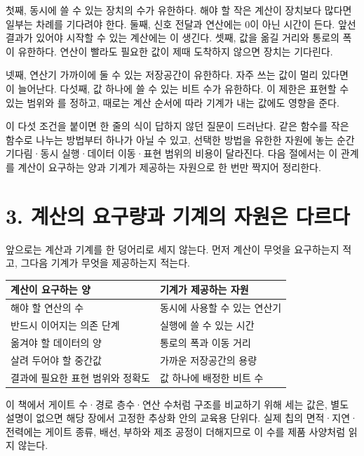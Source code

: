 첫째, 동시에 쓸 수 있는  장치의 수가 유한하다. 해야 할 작은 계산이 장치보다 많다면 일부는 차례를 기다려야 한다. 둘째, 신호 전달과 연산에는 0이 아닌 시간이 든다. 앞선 결과가 있어야 시작할 수 있는 계산에는 이 생긴다. 셋째, 값을 옮길 거리와 통로의 폭이 유한하다. 연산이 빨라도 필요한 값이 제때 도착하지 않으면 장치는 기다린다.

넷째, 연산기 가까이에 둘 수 있는 저장공간이 유한하다. 자주 쓰는 값이 멀리 있다면 이 늘어난다. 다섯째, 값 하나에 쓸 수 있는 비트 수가 유한하다. 이 제한은 표현할 수 있는 범위와 를 정하고, 때로는 계산 순서에 따라 기계가 내는 값에도 영향을 준다.

이 다섯 조건을 붙이면 한 줄의 식이 답하지 않던 질문이 드러난다. 같은 함수를 작은 함수로 나누는 방법부터 하나가 아닐 수 있고, 선택한 방법을 유한한 자원에 놓는 순간 기다림·동시 실행·데이터 이동·표현 범위의 비용이 달라진다. 다음 절에서는 이 관계를 계산이 요구하는 양과 기계가 제공하는 자원으로 한 번만 짝지어 정리한다.

\section*{3. 계산의 요구량과 기계의 자원은 다르다}

앞으로는 계산과 기계를 한 덩어리로 세지 않는다. 먼저 계산이 무엇을 요구하는지 적고, 그다음 기계가 무엇을 제공하는지 적는다.

\begin{center}
\small
\begin{tabular}{>{\raggedright\arraybackslash}p{} >{\raggedright\arraybackslash}p{}}
\toprule
\sffamily\bfseries 계산이 요구하는 양 & \sffamily\bfseries 기계가 제공하는 자원 \\
\midrule
해야 할 연산의 수 & 동시에 사용할 수 있는 연산기 \\
반드시 이어지는 의존 단계 & 실행에 쓸 수 있는 시간 \\
옮겨야 할 데이터의 양 & 통로의 폭과 이동 거리 \\
살려 두어야 할 중간값 & 가까운 저장공간의 용량 \\
결과에 필요한 표현 범위와 정확도 & 값 하나에 배정한 비트 수 \\
\bottomrule
\end{tabular}
\end{center}

이 책에서 게이트 수·경로 층수·연산 수처럼 구조를 비교하기 위해 세는 값은, 별도 설명이 없으면 해당 장에서 고정한 추상화 안의 교육용 단위다. 실제 칩의 면적·지연·전력에는 게이트 종류, 배선, 부하와 제조 공정이 더해지므로 이 수를 제품 사양처럼 읽지 않는다.

